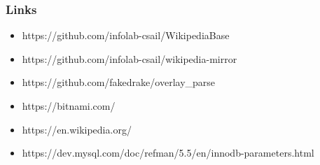 \documentclass[bigger]{beamer}
\begin{document}
\begin{frame}
  \frametitle{Links}
  \begin{itemize}
  \item https://github.com/infolab-csail/WikipediaBase
  \item https://github.com/infolab-csail/wikipedia-mirror
  \item https://github.com/fakedrake/overlay_parse
  \item https://bitnami.com/
  \item https://en.wikipedia.org/
  \item https://dev.mysql.com/doc/refman/5.5/en/innodb-parameters.html
  \end{itemize}
\end{frame}
\end{document}

